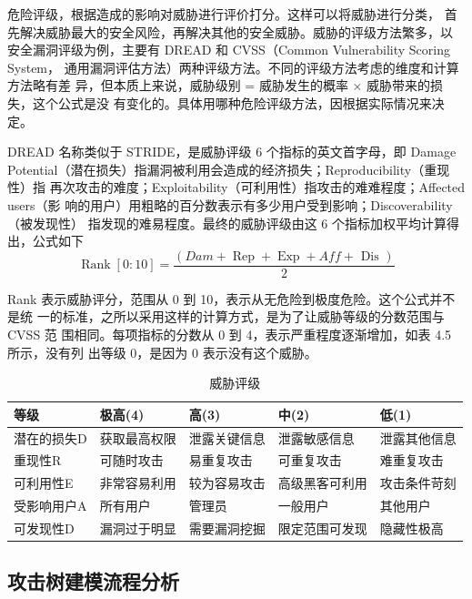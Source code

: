 危险评级，根据造成的影响对威胁进行评价打分。这样可以将威胁进行分类，
首先解决威胁最大的安全风险，再解决其他的安全威胁。威胁的评级方法繁多，以
安全漏洞评级为例，主要有 DREAD 和 CVSS（Common Vulnerability Scoring System，
通用漏洞评估方法）两种评级方法。不同的评级方法考虑的维度和计算方法略有差
异，但本质上来说，威胁级别 = 威胁发生的概率 × 威胁带来的损失，这个公式是没
有变化的。具体用哪种危险评级方法，因根据实际情况来决定。

DREAD 名称类似于 STRIDE，是威胁评级 6 个指标的英文首字母，即 Damage
Potential（潜在损失）指漏洞被利用会造成的经济损失；Reproducibility（重现性）指
再次攻击的难度；Exploitability（可利用性）指攻击的难难程度；Affected users（影
响的用户）用粗略的百分数表示有多少用户受到影响；Discoverability（被发现性）
指发现的难易程度。最终的威胁评级由这 6 个指标加权平均计算得出，公式如下
$$
\operatorname{Rank}[0: 10]=\frac{(D a m+\operatorname{Rep}+\operatorname{Exp}+A f f+\text { Dis })}{2}
$$


Rank 表示威胁评分，范围从 0 到 10，表示从无危险到极度危险。这个公式并不是统
一的标准，之所以采用这样的计算方式，是为了让威胁等级的分数范围与 CVSS 范
围相同。每项指标的分数从 0 到 4，表示严重程度逐渐增加，如表 4.5 所示，没有列
出等级 0，是因为 0 表示没有这个威胁。
\begin{table}
  \caption{威胁评级}
\begin{center}
  \begin{tabular}{|l|l|l|l|l|}
    \hline 等级 & 极高(4) & 高(3) & 中(2) & 低(1) \\
    \hline 潜在的损失D & 获取最高权限 & 泄露关键信息 & 泄露敏感信息 & 泄露其他信息 \\
    \hline 重现性R & 可随时攻击 & 易重复攻击 & 可重复攻击 & 难重复攻击 \\
    \hline 可利用性E & 非常容易利用 & 较为容易攻击 & 高级黑客可利用 & 攻击条件苛刻 \\
    \hline 受影响用户A & 所有用户 & 管理员 & 一般用户 & 其他用户 \\
    \hline 可发现性D & 漏洞过于明显 & 需要漏洞挖掘 & 限定范围可发现 & 隐藏性极高 \\
    \hline
    \end{tabular}
\end{center}
\end{table}

\subsection{攻击树建模流程分析}

